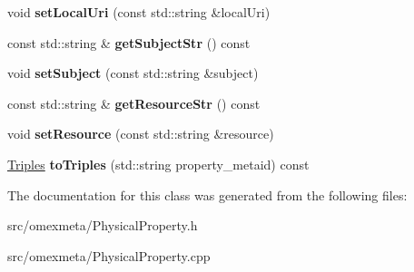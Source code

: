\begin{DoxyCompactItemize}
void {\bfseries set\+Local\+Uri} (const std\+::string \&local\+Uri)
\item 
\mbox{\label{classomexmeta_1_1PhysicalProperty_a4b9ad0a7fe22a3476d7e2f08834bbd74}} 
const std\+::string \& {\bfseries get\+Subject\+Str} () const
\item 
\mbox{\label{classomexmeta_1_1PhysicalProperty_a8bb7c912a21e0e318a9e16d2af1801e5}} 
void {\bfseries set\+Subject} (const std\+::string \&subject)
\item 
\mbox{\label{classomexmeta_1_1PhysicalProperty_a9177d21e829cbd872217ba6f9619d427}} 
const std\+::string \& {\bfseries get\+Resource\+Str} () const
\item 
\mbox{\label{classomexmeta_1_1PhysicalProperty_a420dab52a424d1be5a8610e19407980c}} 
void {\bfseries set\+Resource} (const std\+::string \&resource)
\item 
\mbox{\label{classomexmeta_1_1PhysicalProperty_aa0ef232bbf498c888af52b27f0edced4}} 
\hyperlink{classomexmeta_1_1Triples}{Triples} {\bfseries to\+Triples} (std\+::string property\+\_\+metaid) const
\end{DoxyCompactItemize}


The documentation for this class was generated from the following files\+:\begin{DoxyCompactItemize}
\item 
src/omexmeta/Physical\+Property.\+h\item 
src/omexmeta/Physical\+Property.\+cpp\end{DoxyCompactItemize}
